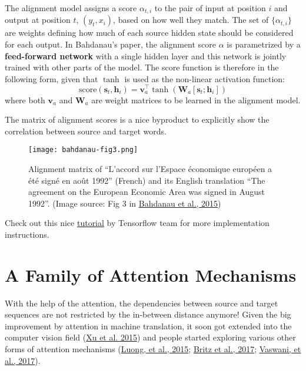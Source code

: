 \documentclass[12pt]{article}
\begin{document}
The alignment model assigns a score $\alpha_{t,i}$ to the pair of input at position $i$ and output at position $t$, $(y_t, x_i)$, based on how well they match. The set of $\{\alpha_{t, i}\}$ are weights defining how much of each source hidden state should be considered for each output. In Bahdanau’s paper, the alignment score $\alpha$ is parametrized by a \textbf{feed-forward network} with a single hidden layer and this network is jointly trained with other parts of the model. The score function is therefore in the following form, given that $\tanh$ is used as the non-linear activation function:
\[
\text{score}(\boldsymbol{s}_t, \boldsymbol{h}_i) = \mathbf{v}_a^\top \tanh(\mathbf{W}_a[\boldsymbol{s}_t; \boldsymbol{h}_i])
\]
where both $\mathbf{v}_a$ and $\mathbf{W}_a$ are weight matrices to be learned in the alignment model.

The matrix of alignment scores is a nice byproduct to explicitly show the correlation between source and target words.

\begin{figure}[H]
    \centering
    \texttt{[image: bahdanau-fig3.png]}
    \caption{Alignment matrix of ``L'accord sur l'Espace économique européen a été signé en août 1992'' (French) and its English translation ``The agreement on the European Economic Area was signed in August 1992''. (Image source: Fig 3 in \href{https://arxiv.org/pdf/1409.0473.pdf}{Bahdanau et al., 2015})}
\end{figure}

Check out this nice \href{https://www.tensorflow.org/versions/master/tutorials/seq2seq}{tutorial} by Tensorflow team for more implementation instructions.

\section{A Family of Attention Mechanisms}
With the help of the attention, the dependencies between source and target sequences are not restricted by the in-between distance anymore! Given the big improvement by attention in machine translation, it soon got extended into the computer vision field (\href{http://proceedings.mlr.press/v37/xuc15.pdf}{Xu et al. 2015}) and people started exploring various other forms of attention mechanisms (\href{https://arxiv.org/pdf/1508.04025.pdf}{Luong, et al., 2015}; \href{https://arxiv.org/abs/1703.03906}{Britz et al., 2017}; \href{http://papers.nips.cc/paper/7181-attention-is-all-you-need.pdf}{Vaswani, et al., 2017}).
\end{document}

